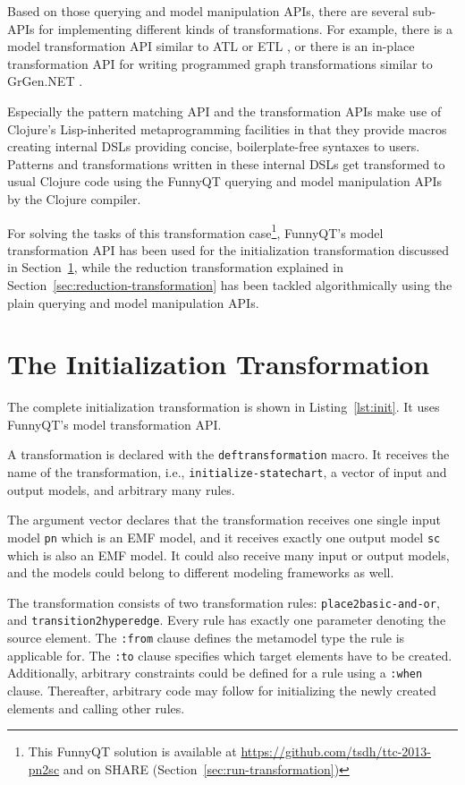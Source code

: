 \documentclass[11pt]{article}
\begin{document}
Based on those querying and model manipulation APIs, there are several sub-APIs
for implementing different kinds of transformations.  For example, there is a
model transformation API similar to ATL \cite{ATL05} or ETL
\cite{booklet:epsilon}, or there is an in-place transformation API for writing
programmed graph transformations similar to GrGen.NET
\cite{manual:GrGenManual}.

Especially the pattern matching API and the transformation APIs make use of
Clojure's Lisp-inherited metaprogramming facilities
\cite{Graham1993OnLisp,Hoyte08LoL} in that they provide macros creating
internal DSLs \cite{book:Fowler2010DSL} providing concise, boilerplate-free
syntaxes to users.  Patterns and transformations written in these internal DSLs
get transformed to usual Clojure code using the FunnyQT querying and model
manipulation APIs by the Clojure compiler.

For solving the tasks of this transformation case\footnote{This FunnyQT
  solution is available at \url{https://github.com/tsdh/ttc-2013-pn2sc}
  and on SHARE (Section~\ref{sec:run-transformation})\label{fn:github}},
FunnyQT's model transformation API has been used for the initialization
transformation discussed in Section~\ref{sec:init-transformation}, while the
reduction transformation explained in
Section~\ref{sec:reduction-transformation} has been tackled algorithmically
using the plain querying and model manipulation APIs.


\section{The Initialization Transformation}
\label{sec:init-transformation}

The complete initialization transformation is shown in Listing~\ref{lst:init}.
It uses FunnyQT's model transformation API.

A transformation is declared with the \verb|deftransformation| macro.  It
receives the name of the transformation, i.e., \verb|initialize-statechart|, a
vector of input and output models, and arbitrary many rules.

The argument vector declares that the transformation receives one single input
model \verb|pn| which is an EMF model, and it receives exactly one output model
\verb|sc| which is also an EMF model.  It could also receive many input or
output models, and the models could belong to different modeling frameworks as
well.

\begin{sloppypar}
  The transformation consists of two transformation rules:
  \verb|place2basic-and-or|, and \verb|transition2hyperedge|.  Every rule has
  exactly one parameter denoting the source element.  The \verb|:from| clause
  defines the metamodel type the rule is applicable for.  The \verb|:to| clause
  specifies which target elements have to be created.  Additionally, arbitrary
  constraints could be defined for a rule using a \verb|:when| clause.
  Thereafter, arbitrary code may follow for initializing the newly created
  elements and calling other rules.
\end{sloppypar}
\end{document}
